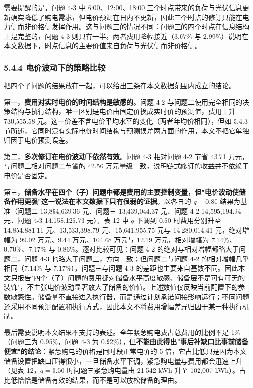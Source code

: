 \documentclass[12pt,a4paper]{ctexart}
\begin{document}
需要提醒的是，问题 4-3 中 6:00、12:00、18:00 三个时点带来的负荷与光伏信息更新确实降低了购电需求，但电价预测在日内不更新，因此三个时点的修订只能在电力侧而非价格侧发挥作用。这与问题三的情况不同：问题三的四个时点在信息结构上是完整的，问题 4-3 则只有一半。两者费用降幅接近（3.07\% 与 2.99\%）说明在本文数据下，时点信息的主要价值来自负荷与光伏侧而非价格侧。

\subsubsection*{5.4.4 电价波动下的策略比较}

把四个子问题的结果放在一起，可以给出三条在本文数据范围内成立的结论。

第一，\textbf{费用对实时电价的时间结构是敏感的}。问题 4-2 与问题二使用完全相同的决策结构与执行结构，唯一区别是电价由固定价换成实时价的预测值，费用上升 730,555.58 元。这一价差不含电价平均水平的变化（两者年均价相同），但如 5.4.3 节所述，它同时混有实际电价时间结构与预测误差两方面的作用，本文不把它单独归因于电价预测误差。

第二，\textbf{多次修订在电价波动下依然有效}。问题 4-3 相对问题 4-2 节省 43.71 万元，与问题三相对问题二节省的 42.56 万元量级一致，说明链式修订的收益并不依赖于电价是否固定。

第三，\textbf{储备水平在四个（子）问题中都是费用的主要控制变量，但"电价波动使储备作用更强"这一说法在本文数据下只有很弱的证据}。以各自的 $q=0.80$ 结果为基准（问题二 13,864,639.36 元、问题三 13,439,044.37 元、问题 4-2 14,595,194.94 元、问题 4-3 14,158,125.73 元），表 12 中 $q$ 下调到 0.50 时费用分别升至 14,854,881.11 元、13,533,398.79 元、15,641,955.75 元与 14,280,014.41 元，绝对增幅为 99.02 万元、9.44 万元、104.68 万元与 12.19 万元，相对增幅为 7.14\%、0.70\%、7.17\% 与 0.86\%。逐对比较可见：问题 4-2 的绝对与相对增幅都略大于问题二，问题 4-3 也略大于问题三，方向一致；但问题二与问题 4-2 的相对增幅几乎相同（7.14\% 与 7.17\%），问题三与问题 4-3 的差距也主要来自基数不同。因此本文只报告"四个（子）问题的费用都对储备水平高度敏感、储备层不是可有可无的装饰"，不主张电价波动显著放大了储备的价值。上述数值仅反映当前配置下的参数敏感性。储备量不直接进入执行器，而是通过计划承诺间接影响运行；不同问题还采用不同预测配置和执行方式，因此本文不将费用增幅差异归因于某一种执行机制。

最后需要说明本文结果不支持的表述。全年紧急购电费占总费用的比例不足 1\%（问题三为 0.95\%，问题 4-3 为 0.92\%），但\textbf{不能由此得出"事后补缺口比事前储备便宜"的结论}：紧急购电的价格是同时段正常电价的 5 倍，它占比低只是因为本文储备设置把缺口压得很小，一旦储备水平下调，紧急购电量与费用都会迅速上升（见表 12，$q=0.50$ 时问题三紧急购电量由 21,542 kWh 升至 102,007 kWh）。占比低恰恰是储备有效的结果，而不是可以放松储备的理由。
\end{document}
